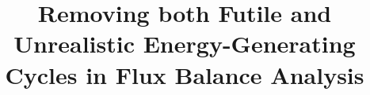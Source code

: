\documentclass[twocolumn]{bmcart}%
\begin{document}
\begin{frontmatter}

\begin{fmbox}


\title{Removing both Futile and Unrealistic Energy-Generating Cycles in Flux Balance Analysis}


\author[
   addressref={aff1},                   %
   corref={aff1},                       %
   email={noor@imsb.biol.ethz.ch}       %
]{ }


\address[id=aff1]{%
  , %
  ,                             %
}




\end{fmbox}
\end{frontmatter}
\end{document}
